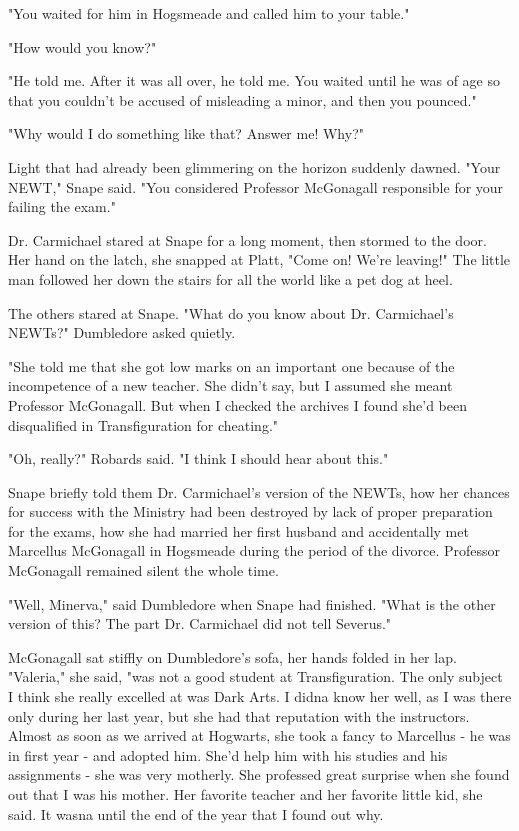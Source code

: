 "You waited for him in Hogsmeade and called him to your table."

"How would you know?"

"He told me. After it was all over, he told me. You waited until he was of age so that you couldn't be accused of misleading a minor, and then you pounced."

"Why would I do something like that? Answer me! Why?"

Light that had already been glimmering on the horizon suddenly dawned. "Your NEWT," Snape said. "You considered Professor McGonagall responsible for your failing the exam."

Dr. Carmichael stared at Snape for a long moment, then stormed to the door. Her hand on the latch, she snapped at Platt, "Come on! We're leaving!" The little man followed her down the stairs for all the world like a pet dog at heel.

The others stared at Snape. "What do you know about Dr. Carmichael's NEWTs?" Dumbledore asked quietly.

"She told me that she got low marks on an important one because of the incompetence of a new teacher. She didn't say, but I assumed she meant Professor McGonagall. But when I checked the archives I found she'd been disqualified in Transfiguration for cheating."

"Oh, really?" Robards said. "I think I should hear about this."

Snape briefly told them Dr. Carmichael's version of the NEWTs, how her chances for success with the Ministry had been destroyed by lack of proper preparation for the exams, how she had married her first husband and accidentally met Marcellus McGonagall in Hogsmeade during the period of the divorce. Professor McGonagall remained silent the whole time.

"Well, Minerva," said Dumbledore when Snape had finished. "What is the other version of this? The part Dr. Carmichael did not tell Severus."

McGonagall sat stiffly on Dumbledore's sofa, her hands folded in her lap. "Valeria," she said, "was not a good student at Transfiguration. The only subject I think she really excelled at was Dark Arts. I didna know her well, as I was there only during her last year, but she had that reputation with the instructors. Almost as soon as we arrived at Hogwarts, she took a fancy to Marcellus - he was in first year - and adopted him. She'd help him with his studies and his assignments - she was very motherly. She professed great surprise when she found out that I was his mother. Her favorite teacher and her favorite little kid, she said. It wasna until the end of the year that I found out why.

